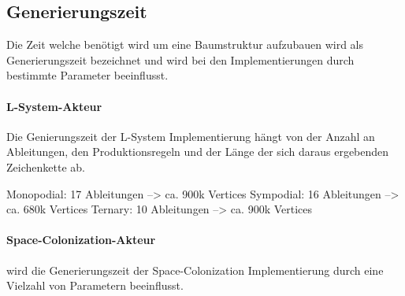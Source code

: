 \subsection{Generierungszeit}
Die Zeit welche benötigt wird um eine Baumstruktur aufzubauen wird als Generierungszeit bezeichnet und wird bei den Implementierungen durch bestimmte Parameter beeinflusst.

\paragraph{L-System-Akteur}

Die Genierungszeit der L-System Implementierung hängt von der Anzahl an Ableitungen, den Produktionsregeln und der Länge der sich daraus ergebenden Zeichenkette ab. 

Monopodial: 17 Ableitungen --> ca. 900k Vertices
Sympodial: 16 Ableitungen --> ca. 680k Vertices
Ternary: 10 Ableitungen --> ca. 900k Vertices


\paragraph{Space-Colonization-Akteur}

 wird die Generierungszeit der Space-Colonization Implementierung durch eine Vielzahl von Parametern beeinflusst.


